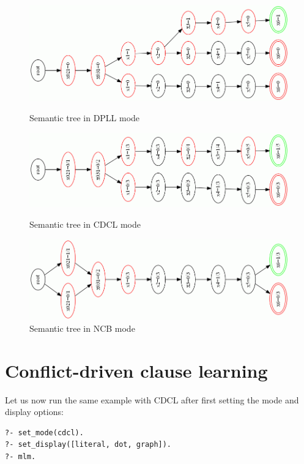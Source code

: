 \documentclass[11pt]{report}
\begin{document}
\begin{figure}
\begin{center}
\includegraphics[keepaspectratio=true,width=.9\textwidth]{tree1}
\caption{Semantic tree in DPLL mode}\label{fig.tree1}

\bigskip
\bigskip
\bigskip

\includegraphics[keepaspectratio=true,width=.9\textwidth]{tree2}
\caption{Semantic tree in CDCL mode}\label{fig.tree2}

\bigskip
\bigskip
\bigskip

\includegraphics[keepaspectratio=true,width=.9\textwidth]{tree3}
\end{center}
\caption{Semantic tree in NCB mode}\label{fig.tree3}
\end{figure}

\clearpage

\section{Conflict-driven clause learning}

Let us now run the same example with CDCL after first setting the mode
and display options:

\begin{verbatim}
?- set_mode(cdcl).
?- set_display([literal, dot, graph]).
?- mlm.
\end{verbatim}
\end{document}
